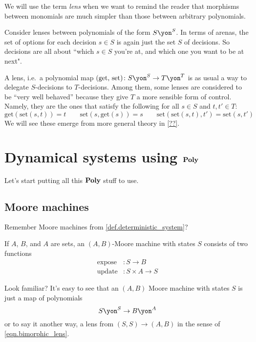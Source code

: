 \documentclass[DynamicalBook]{subfiles}
\begin{document}
We will use the term \emph{lens} when we want to remind the reader that morphisms between monomials are much simpler than those between arbitrary polynomials.

\begin{remark}
Consider lenses between polynomials of the form $S\yon^S$. In terms of arenas, the set of options for each decision $s\in S$ is again just the set $S$ of decisions. So decisions are all about ``which $s\in S$ you're at, and which one you want to be at next".

A lens, i.e.\ a polynomial map $(\text{get, set})\colon S\yon^S\to T\yon^T$ is as usual a way to delegate $S$-decisions to $T$-decisions. Among them, some lenses are considered to be ``very well behaved'' because they give $T$ a more sensible form of control. Namely, they are the ones that satisfy the following for all $s\in S$ and $t,t'\in T$:
\[
	\text{get}(\text{set}(s,t))=t
	\qquad
  \text{set}(s,\text{get}(s))=s
  \qquad
  \text{set}(\text{set}(s,t),t')=\text{set}(s,t')
\]
We will see these emerge from more general theory in \cref{??}.
\end{remark}


\section{Dynamical systems using $\textbf{Poly}$}\label{sec.dynam_in_poly}

Let's start putting all this $\textbf{Poly}$ stuff to use. 

\subsection{Moore machines}

Remember Moore machines from \cref{def.deterministic_system}? 

\begin{definition}\label{def.moore_machine_again}
If $A$, $B$, and $A$ are sets, an $(A,B)$-Moore machine with states $S$ consists of two functions
\begin{align*}
	\text{expose}&\colon S\to B\\
	\text{update}&\colon S\times A\to S 
\end{align*}
\end{definition}

Look familiar?  It's easy to see that an $(A,B)$ Moore machine with states $S$ is just a map of polynomials
\[
S\yon^S\to B\yon^A
\]
or to say it another way, a lens from $(S,S)\to(A,B)$ in the sense of \cref{eqn.bimorphic_lens}.
\end{document}
